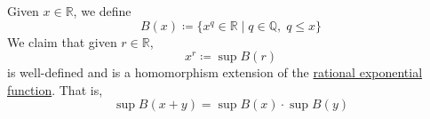   \begin{corollary}
    \label{thm:real-exponential-function}
    Given $x\in \mathbb{R}$, we define 
    \begin{equation}
      B(x) \coloneqq \{ x^q \in \mathbb{R} \mid q \in \mathbb{Q}, \; q \leq x \}
    \end{equation}
    We claim that given $r \in \mathbb{R}$, 
    \begin{equation}
      x^r \coloneqq \sup B(r)
    \end{equation}
    is well-defined and is a homomorphism extension of the \hyperref[thm:rational-exponential-function]{rational exponential function}. That is, 
    \begin{equation}
      \sup{B(x + y)} = \sup{B(x)} \cdot \sup{B(y)}
    \end{equation}
  \end{corollary}
